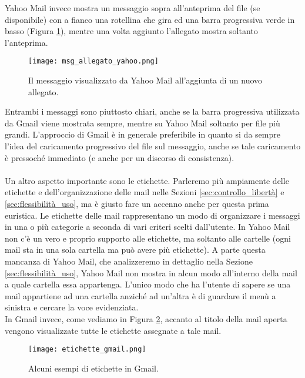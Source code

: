 		Yahoo Mail invece mostra un messaggio sopra all'anteprima del file (se disponibile) con a fianco una rotellina che gira ed una barra progressiva verde in basso (Figura \ref{fig:msg_allegato_yahoo}), mentre una volta aggiunto l'allegato mostra soltanto l'anteprima.
		\begin{figure}[h!]
			\begin{center}
				\texttt{[image: msg\_allegato\_yahoo.png]}
			\end{center}
			\caption[Messaggio all'aggiunta di un allegato in Yahoo Mail]{Il messaggio visualizzato da Yahoo Mail all'aggiunta di un nuovo allegato.}
			\label{fig:msg_allegato_yahoo}
		\end{figure}
		
		Entrambi i messaggi sono piuttosto chiari, anche se la barra progressiva utilizzata da Gmail viene mostrata sempre, mentre su Yahoo Mail soltanto per file più grandi. L'approccio di Gmail è in generale preferibile in quanto si da sempre l'idea del caricamento progressivo del file sul messaggio, anche se tale caricamento è pressoché immediato (e anche per un discorso di consistenza).\\
		\\
		Un altro aspetto importante sono le etichette. Parleremo più ampiamente delle etichette e dell'organizzazione delle mail nelle Sezioni \ref{sec:controllo_libertà} e \ref{sec:flessibilità_uso}, ma è giusto fare un accenno anche per questa prima euristica. Le etichette delle mail rappresentano un modo di organizzare i messaggi in una o più categorie a seconda di vari criteri scelti dall'utente. In Yahoo Mail non c'è un vero e proprio supporto alle etichette, ma soltanto alle cartelle (ogni mail sta in una sola cartella ma può avere più etichette). A parte questa mancanza di Yahoo Mail, che analizzeremo in dettaglio nella Sezione \ref{sec:flessibilità_uso}, Yahoo Mail non mostra in alcun modo all'interno della mail a quale cartella essa appartenga. L'unico modo che ha l'utente di sapere se una mail appartiene ad una cartella anziché ad un'altra è di guardare il menù a sinistra e cercare la voce evidenziata.\\
		In Gmail invece, come vediamo in Figura \ref{fig:etichette_gmail}, accanto al titolo della mail aperta vengono visualizzate tutte le etichette assegnate a tale mail.
		\begin{figure}[h!]
			\begin{center}
				\texttt{[image: etichette\_gmail.png]}
			\end{center}
			\caption[Etichette in Gmail]{Alcuni esempi di etichette in Gmail.}
			\label{fig:etichette_gmail}
		\end{figure}
		
